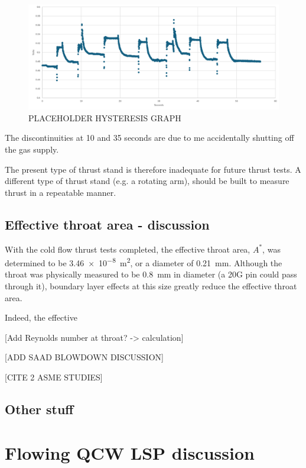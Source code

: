         \begin{figure}[h]
            \centering
            \includegraphics[width=0.8\linewidth]{assets/5 discussion/hysterisis.png}
            \caption{PLACEHOLDER HYSTERESIS GRAPH}
            \label{fig:double choke sizing}
        \end{figure}


        The discontinuities at 10 and 35 seconds are due to me accidentally shutting off the gas supply.

        The present type of thrust stand is therefore inadequate for future thrust tests. A different type of thrust stand (e.g. a rotating arm), should be built to measure thrust in a repeatable manner.

    \subsection{Effective throat area - discussion}
            
        With the cold flow thrust tests completed, the effective throat area, $A^*$, was determined to be \qty{3.46e-8}{m^2}, or a diameter of \qty{0.21}{mm}. Although the throat was physically measured to be \qty{0.8}{mm} in diameter (a 20G pin could pass through it), boundary layer effects at this size greatly reduce the effective throat area.

        Indeed, the effective

        [Add Reynolds number at throat? -> calculation]

        [ADD SAAD BLOWDOWN DISCUSSION]

        [CITE 2 ASME STUDIES]

    \subsection*{Other stuff}

\section{Flowing QCW LSP discussion}

